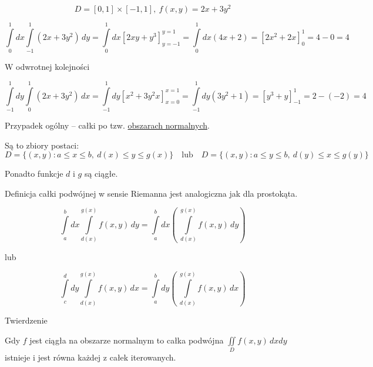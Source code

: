 \begin{przyklad}

\[ D = [0,1] \times [-1,1], \ f(x,y) = 2x + 3y^2 \]

\[ \int\limits_{0}^{1} dx \int\limits_{-1}^{1} (2x+3y^2) \, dy = \int\limits_{0}^{1} dx \left[ 2xy + y^3 \right]_{y = -1}^{y=1} 
= \int\limits_{0}^{1} dx (4x+2) = \left[ 2x^2 + 2x \right]_0^1 = 4 - 0 = 4 \]

\begin{center} W odwrotnej kolejności \end{center}
\[ \int\limits_{-1}^{1} dy \int\limits_{0}^{1} (2x+3y^2)\, dx = \int\limits_{-1}^{1} dy \left[ x^2 + 3y^2x \right]_{x=0}^{x=1} 
= \int\limits_{-1}^{1} dy (3y^2 + 1) = \left[ y^3 + y \right]_{-1}^{1} = 2- (-2) = 4 \]

Przypadek ogólny -- całki po tzw. \underline{obszarach normalnych}.

Są to zbiory postaci:
\[ D = \{ (x,y): a \leq x \leq b, \ d(x) \leq y \leq g(x) \} \quad \textrm{lub} \quad D = \{ (x,y): a \leq y \leq b, \ d(y) \leq x \leq g(y) \} \]

Ponadto funkcje $d$ i $g$ są ciągłe.
\end{przyklad}

Definicja całki podwójnej w sensie Riemanna jest analogiczna jak dla prostokąta.

\[ \int\limits_{a}^{b} dx \int\limits_{d(x)}^{g(x)} f(x,y)\, dy = \int\limits_{a}^{b} dx \left( \ \int\limits_{d(x)}^{g(x)} f(x,y)\, dy \right) \]
\begin{center} lub \end{center}
\[ \int\limits_{c}^{d} dy \int\limits_{d(x)}^{g(x)} f(x,y)\, dx = \int\limits_{a}^{b} dy \left( \ \int\limits_{d(x)}^{g(x)} f(x,y)\, dx \right) \]

\begin{tw}{Twierdzenie}

Gdy $f$ jest ciągła na obszarze normalnym to całka podwójna $ \iint\limits_{D} f(x,y)\, dxdy $ istnieje i jest równa każdej z całek iterowanych. 

\end{tw}

